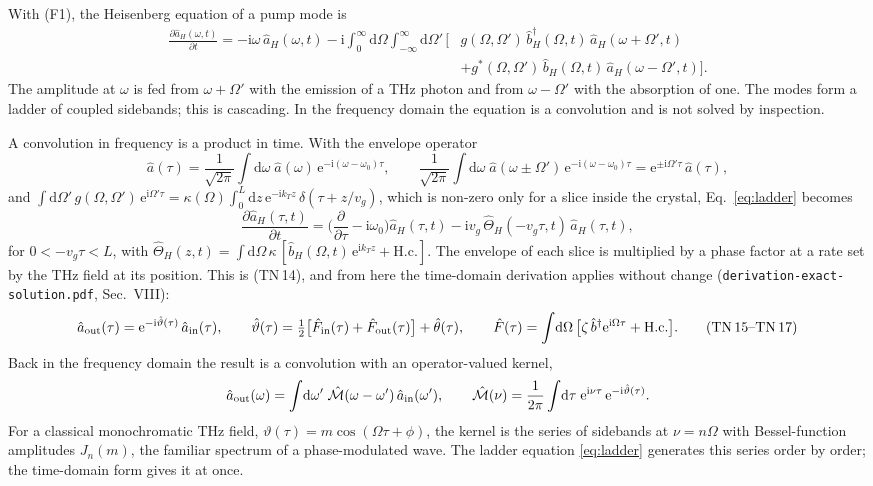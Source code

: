 \documentclass[aps,pra,onecolumn,notitlepage,11pt,amsmath,amssymb,nofootinbib]{revtex4-2}
\newcommand{\dd}{\mathrm{d}}
\newcommand{\ee}{\mathrm{e}}
\newcommand{\ii}{\mathrm{i}}
\newcommand{\TN}[1]{\text{TN\,#1}}
\begin{document}
With (F1), the Heisenberg equation of a pump mode is
\begin{align}
\frac{\partial\hat a_H(\omega,t)}{\partial t}=-\ii\omega\,\hat a_H(\omega,t)
-\ii\int_0^\infty\!\!\dd\Omega\int_{-\infty}^{\infty}\!\!\dd\Omega'\,
\Big[&g(\Omega,\Omega')\,\hat b_H^\dagger(\Omega,t)\,\hat a_H(\omega+\Omega',t)\nonumber\\
&+g^*(\Omega,\Omega')\,\hat b_H(\Omega,t)\,\hat a_H(\omega-\Omega',t)\Big].
\label{eq:ladder}
\end{align}
The amplitude at $\omega$ is fed from $\omega+\Omega'$ with the emission of a
THz photon and from $\omega-\Omega'$ with the absorption of one. The modes
form a ladder of coupled sidebands; this is cascading. In the frequency
domain the equation is a convolution and is not solved by inspection.

A convolution in frequency is a product in time. With the envelope operator
\begin{equation}
\hat a(\tau)=\frac{1}{\sqrt{2\pi}}\int\!\dd\omega\;\hat a(\omega)\,\ee^{-\ii(\omega-\omega_0)\tau},
\qquad
\frac{1}{\sqrt{2\pi}}\int\!\dd\omega\;\hat a(\omega\pm\Omega')\,\ee^{-\ii(\omega-\omega_0)\tau}
=\ee^{\pm\ii\Omega'\tau}\,\hat a(\tau),
\end{equation}
and
$\int\dd\Omega'\,g(\Omega,\Omega')\,\ee^{\ii\Omega'\tau}
=\kappa(\Omega)\int_0^L\dd z\,\ee^{-\ii k_Tz}\,\delta(\tau+z/v_g)$, which is
non-zero only for a slice inside the crystal, Eq.~\eqref{eq:ladder} becomes
\begin{equation}
\frac{\partial\hat a_H(\tau,t)}{\partial t}
=\Big(\frac{\partial}{\partial\tau}-\ii\omega_0\Big)\hat a_H(\tau,t)
-\ii v_g\,\hat\Theta_H(-v_g\tau,t)\,\hat a_H(\tau,t),
\end{equation}
for $0<-v_g\tau<L$, with
$\hat\Theta_H(z,t)=\int\dd\Omega\,\kappa\,[\hat b_H(\Omega,t)\,\ee^{\ii k_Tz}+\mathrm{H.c.}]$.
The envelope of each slice is multiplied by a phase
factor at a rate set by the THz field at its position. This is (TN\,14), and
from here the time-domain derivation applies without change
(\texttt{derivation-exact-solution.pdf}, Sec.~VIII):
\begin{equation}
\hat a_{\rm out}(\tau)=\ee^{-\ii\hat\vartheta(\tau)}\,\hat a_{\rm in}(\tau),\qquad
\hat\vartheta(\tau)=\tfrac12\big[\hat F_{\rm in}(\tau)+\hat F_{\rm out}(\tau)\big]+\hat\theta(\tau),\qquad
\hat F(\tau)=\int\!\dd\Omega\,\big[\zeta\,\hat b^\dagger\ee^{\ii\Omega\tau}+\mathrm{H.c.}\big].
\tag{\TN{15}--\TN{17}}
\end{equation}
Back in the frequency domain the result is a convolution with an
operator-valued kernel,
\begin{equation}
\hat a_{\rm out}(\omega)=\int\!\dd\omega'\;\hat{\mathcal M}(\omega-\omega')\,\hat a_{\rm in}(\omega'),
\qquad
\hat{\mathcal M}(\nu)=\frac{1}{2\pi}\int\!\dd\tau\;\ee^{\ii\nu\tau}\,\ee^{-\ii\hat\vartheta(\tau)} .
\end{equation}
For a classical monochromatic THz field, $\vartheta(\tau)=m\cos(\Omega\tau+\phi)$,
the kernel is the series of sidebands at $\nu=n\Omega$ with Bessel-function
amplitudes $J_n(m)$, the familiar spectrum of a phase-modulated wave. The
ladder equation \eqref{eq:ladder} generates this series order by order; the
time-domain form gives it at once.
\end{document}
